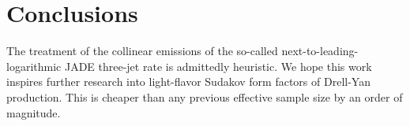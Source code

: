 \section{Conclusions}\label{sec:conclusions}

The treatment of the collinear emissions of the so-called
next-to-leading-logarithmic JADE three-jet rate is admittedly heuristic.
We hope this work inspires further research into light-flavor Sudakov
form factors of Drell-Yan production. This is cheaper than any previous
effective sample size by an order of magnitude.

